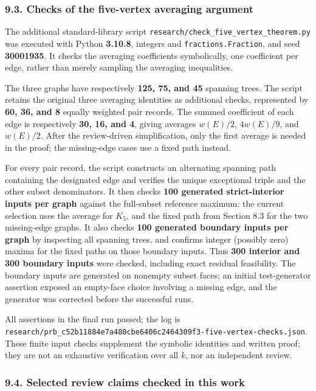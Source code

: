 \documentclass{article}
\begin{document}
\subsubsection{9.3. Checks of the five-vertex averaging argument}

The additional standard-library script \texttt{research/check\_five\_vertex\_theorem.py} was executed with Python \textbf{3.10.8}, integers and \texttt{fractions.Fraction}, and seed \textbf{30001935}. It checks the averaging coefficients symbolically, one coefficient per edge, rather than merely sampling the averaging inequalities.

The three graphs have respectively \textbf{125, 75, and 45} spanning trees. The script retains the original three averaging identities as additional checks, represented by \textbf{60, 36, and 8} equally weighted pair records. The summed coefficient of each edge is respectively \textbf{30, 16, and 4}, giving averages \(w(E)/2\), \(4w(E)/9\), and \(w(E)/2\). After the review-driven simplification, only the first average is needed in the proof; the missing-edge cases use a fixed path instead.

For every pair record, the script constructs an alternating spanning path containing the designated edge and verifies the unique exceptional triple and the other subset denominators. It then checks \textbf{100 generated strict-interior inputs per graph} against the full-subset reference maximum: the current selection uses the average for \(K_5\), and the fixed path from Section 8.3 for the two missing-edge graphs. It also checks \textbf{100 generated boundary inputs per graph} by inspecting all spanning trees, and confirms integer (possibly zero) maxima for the fixed paths on those boundary inputs. Thus \textbf{300 interior and 300 boundary inputs} were checked, including exact residual feasibility. The boundary inputs are generated on nonempty subset faces; an initial test-generator assertion exposed an empty-face choice involving a missing edge, and the generator was corrected before the successful runs.

All assertions in the final run passed; the log is \texttt{research/prb_c52b11884e7a480cbe6406c2464309f3-five-vertex-checks.json}. These finite input checks supplement the symbolic identities and written proof; they are not an exhaustive verification over all \(k\), nor an independent review.

\subsubsection{9.4. Selected review claims checked in this work}
\end{document}
